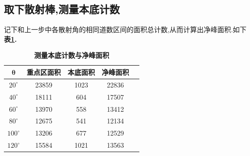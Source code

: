 \documentclass[a4paper]{article}
\begin{document}
\subsection{取下散射棒,测量本底计数}\label{sub3}
记下和上一步中各散射角的相同道数区间的面积总计数,从而计算出净峰面积.如下\textbf{表\ref{tab:table2}.}
\begin{table}[H]
\caption{\textbf{测量本底计数与净峰面积}}
\label{tab:table2}
\begin{center}
\setlength{\tabcolsep}{7mm}
\begin{tabular}{|c|c|c|c|c|}%
    \toprule
	\hline
	$\bm \theta$ & \textbf{重点区面积} & \textbf{本底面积} & \textbf{净峰面积} \\ \hline \hline
	$20^{\circ}$ & 23859 & 1023 & 22836\\ \hline
	$40^{\circ}$ & 18111 & 604 & 17507\\ \hline
	$60^{\circ}$ & 13970 & 558 & 13412\\ \hline
	$80^{\circ}$ & 12675 & 541 & 12134\\ \hline
	$100^{\circ}$ & 13206 & 677 & 12529\\ \hline
	$120^{\circ}$ & 15584 & 1021 & 13563\\ \hline
	\bottomrule
	\end{tabular}
\end{center}
\end{table}

\end{document}
